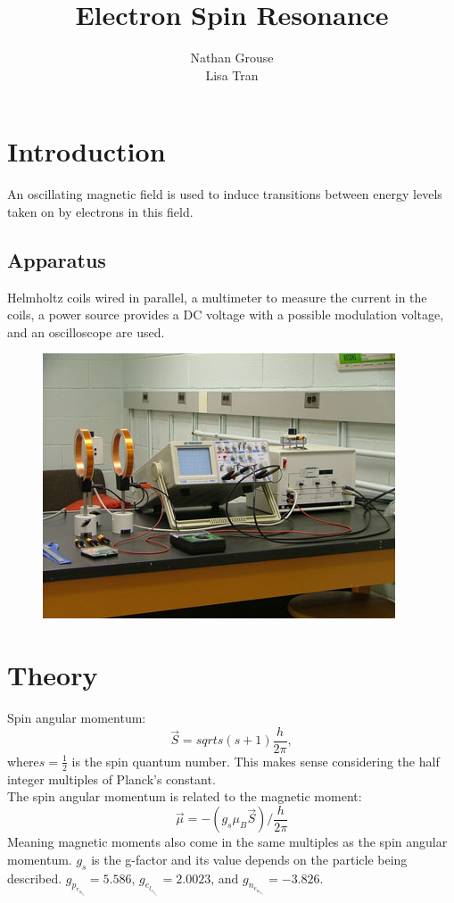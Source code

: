 \documentclass[12pt]{article}
\title{Electron Spin Resonance}
\author{Nathan Grouse\\Lisa Tran}
\begin{document}
\maketitle

\section{Introduction}
\indent \indent An oscillating magnetic field is used to induce transitions between energy levels taken on by electrons in this field.

\subsection{Apparatus}
\indent \indent Helmholtz coils wired in parallel, a multimeter to measure the current in the coils, a power source provides a DC voltage with a possible modulation voltage, and an oscilloscope are used.

\begin{figure}[H]
\centering
\hspace{-0.0in}\includegraphics[scale=0.90]{apparatus.png}
\end{figure}

\section{Theory}
\indent \indent Spin angular momentum:
\[\vec{S} = sqrt{s(s+1)}\frac{h}{2\pi} , \]
\indent where$s = \frac{1}{2}$ is the spin quantum number. This makes sense considering the half integer multiples of Planck's constant. \\

The spin angular momentum is related to the magnetic moment:
\[ \vec{\mu} = -(g_s \mu_B \vec{S})/\frac{h}{2\pi} \]
\indent Meaning magnetic moments also come in the same multiples as the spin angular momentum. $g_s$ is the g-factor and its value depends on the particle being described. $g_p_r_o_t_o_n = 5.586$, $g_e_l_e_c_t_r_o_n = 2.0023$, and $g_n_e_u_t_r_o_n = -3.826$. \\
\end{document}

